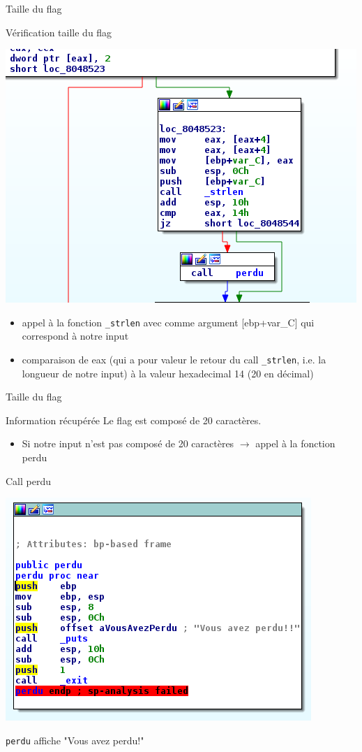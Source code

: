 \documentclass[10pt,sans,usenames,dvipsnames,french,compress]{beamer}
\begin{document}
\begin{frame}[fragile]{Taille du flag}
	\begin{block}{Vérification taille du flag}
		\begin{center}
			\includegraphics[width=0.5\linewidth]{114/lenght.png}
		\end{center}
	\end{block}

	\begin{exampleblock}{}
		\begin{itemize}
			\item appel à la fonction \texttt{\_strlen} avec comme argument [ebp+var\_C] qui correspond à notre input
			\item comparaison de eax (qui a pour valeur le retour du call \texttt{\_strlen}, i.e. la longueur de notre input) à la valeur hexadecimal 14 (20 en décimal)
		\end{itemize}
	\end{exampleblock}
\end{frame}

\begin{frame}[fragile]{Taille du flag}
	\begin{block}{Information récupérée}
		Le flag est composé de 20 caractères.
	\end{block}

	\begin{exampleblock}{}
		\begin{itemize}
			\item Si notre input n'est pas composé de 20 caractères $ \rightarrow $ appel à la fonction perdu
		\end{itemize}
	\end{exampleblock}
\end{frame}

\begin{frame}[fragile]{Call perdu}
 	\begin{center}
		\includegraphics[width=0.5\linewidth]{114/perdu.png}
	\end{center}

	\begin{block}{}
		\texttt{perdu} affiche "Vous avez perdu!"
	\end{block}
\end{frame}
		
\end{document}
